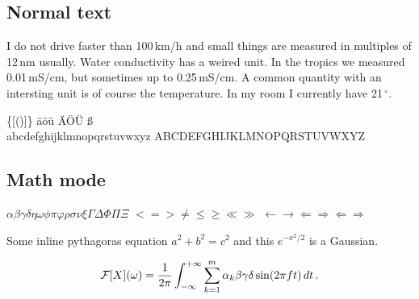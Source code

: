 \subsection{Normal text}

I do not drive faster than 100\,km/h and small things are measured in
multiples of 12\,nm usually. Water conductivity has a weired unit. In
the tropics we measured 0.01\,mS/cm, but sometimes up to
0.25\,mS/cm. A common quantity with an intersting unit is of course
the temperature. In my room I currently have 21\,$^{\circ}$.

\bigskip
{} \qquad \{[()]\} \qquad \"a\"o\"u  \"A\"O\"U {\ss} \\
abcdefghijklmnopqrstuvwxyz \qquad ABCDEFGHIJKLMNOPQRSTUVWXYZ

\subsection{Math mode}

$\alpha\beta\gamma\delta\eta\omega\phi\pi\varphi\rho\sigma\nu\xi\Gamma\Delta\Phi\Pi\Xi$
$<=> \ne \le \ge \ll \gg$
$\leftarrow \rightarrow \Leftarrow \Rightarrow \Longleftarrow \Longrightarrow$

\bigskip
\noindent
Some inline pythagoras equation $a^2 + b^2 = c^2$ and this $e^{-x^2/2}$ is a Gaussian.

\[ {\cal F}[X](\omega) = \frac{1}{2\pi}\int_{-\infty}^{+\infty} \sum_{k=1}^m \alpha_k\beta\gamma\delta\sin(2\pi f t)\,dt\,. \]
